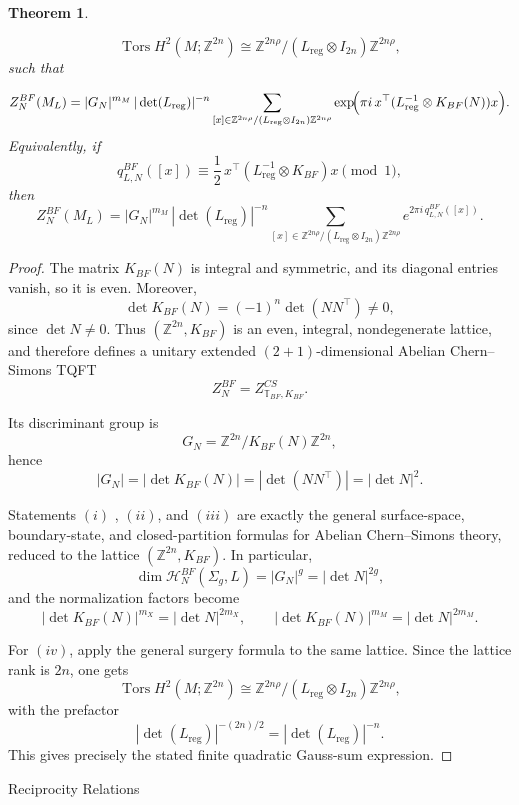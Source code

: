\documentclass[12pt]{amsart}
\makeatletter
\renewcommand\section{\@startsection{section}{1}%
  \z@{.7\linespacing\@plus\linespacing}{.5\linespacing}%
  {\normalfont\bfseries\centering}}
\numberwithin{equation}{section}
\newtheorem{theorem}{Theorem}[section]
\theoremstyle{definition}
\makeatother
\begin{document}
\begin{theorem}
\begin{enumerate}[label=\roman*)]
$$
\operatorname{Tors}H^2(M;\mathbb Z^{2n})
\cong
\mathbb Z^{2n\rho}/(L_{\mathrm{reg}}\otimes I_{2n})\mathbb Z^{2n\rho},
$$
such that

$$
Z_N^{BF}(M_L)
=
|G_N|^{m_M}\,
|\det(L_{\mathrm{reg}})|^{-n}
\sum_{[x]\in \mathbb Z^{2n\rho}/(L_{\mathrm{reg}}\otimes I_{2n})\mathbb Z^{2n\rho}}
\exp\!\Bigl(\pi i\,x^\top(L_{\mathrm{reg}}^{-1}\otimes K_{BF}(N))x\Bigr).
$$
Equivalently, if
$$
q^{BF}_{L,N}([x])\equiv
\frac12\,x^\top(L_{\mathrm{reg}}^{-1}\otimes K_{BF})x
\pmod 1,
$$
then
$$
Z_N^{BF}(M_L)
=
|G_N|^{m_M}\,
|\det(L_{\mathrm{reg}})|^{-n}
\sum_{[x]\in \mathbb Z^{2n\rho}/(L_{\mathrm{reg}}\otimes I_{2n})\mathbb Z^{2n\rho}}
e^{2\pi i\,q^{BF}_{L,N}([x])}.
$$
\end{enumerate}
\end{theorem}

\begin{proof}
The matrix $K_{BF}(N)$ is integral and symmetric, and its diagonal entries vanish, so it
is even. Moreover,
$$
\det K_{BF}(N)=(-1)^n\det(NN^\top)\neq 0,
$$
since $\det N\neq 0$. Thus $(\mathbb Z^{2n},K_{BF})$ is an even, integral,
nondegenerate lattice, and therefore defines a unitary extended $(2+1)$-dimensional
Abelian Chern--Simons TQFT
$$
Z_N^{BF}=Z^{CS}_{\mathbb T_{BF},K_{BF}}.
$$

Its discriminant group is
$$
G_N=\mathbb Z^{2n}/K_{BF}(N)\mathbb Z^{2n},
$$
hence
$$
|G_N|=|\det K_{BF}(N)|=|\det(NN^\top)|=|\det N|^2.
$$

Statements $(i)$ , $(ii)$, and $(iii)$ are exactly the general surface-space, boundary-state, and closed-partition formulas for Abelian Chern--Simons theory, reduced to the lattice $(\mathbb Z^{2n},K_{BF})$. In particular,
$$
\dim \mathcal H_N^{BF}(\Sigma_g,L)=|G_N|^g=|\det N|^{2g},
$$
and the normalization factors become
$$
|\det K_{BF}(N)|^{m_X}=|\det N|^{2m_X},
\qquad
|\det K_{BF}(N)|^{m_M}=|\det N|^{2m_M}.
$$

For $(iv)$, apply the general surgery formula to the same lattice. Since the
lattice rank is $2n$, one gets
$$
\operatorname{Tors}H^2(M;\mathbb Z^{2n})
\cong
\mathbb Z^{2n\rho}/(L_{\mathrm{reg}}\otimes I_{2n})\mathbb Z^{2n\rho},
$$
with the prefactor
$$
|\det(L_{\mathrm{reg}})|^{-(2n)/2}=|\det(L_{\mathrm{reg}})|^{-n}.
$$
This gives precisely the stated finite quadratic Gauss-sum expression.
\end{proof}



\section{Reciprocity Relations}
\label{sec:reciprocity}
\end{document}
